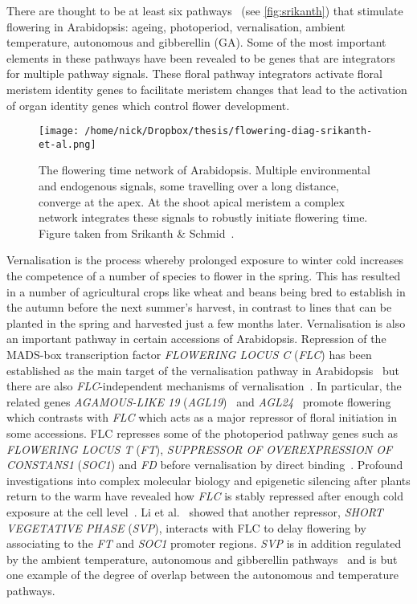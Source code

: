 There are thought to be at least six pathways~\cite{simpson2002,srikanth2011} (see \autoref{fig:srikanth}) that stimulate flowering in Arabidopsis: ageing, photoperiod, vernalisation, ambient temperature, autonomous and gibberellin (GA).
Some of the most important elements in these pathways have been revealed to be genes that are integrators for multiple pathway signals.
These floral pathway integrators activate floral meristem identity genes to facilitate meristem changes that lead to the activation of organ identity genes which control flower development.

\begin{figure*}[hptb!]
  \texttt{[image: /home/nick/Dropbox/thesis/flowering-diag-srikanth-et-al.png]}
  \caption{The flowering time network of Arabidopsis.
    Multiple environmental and endogenous signals, some travelling over a long distance, converge at the apex.
    At the shoot apical meristem a complex network integrates these signals to robustly initiate flowering time.
    Figure taken from Srikanth \& Schmid~\cite{srikanth2011}.
  }
  \label{fig:srikanth}
\end{figure*}
Vernalisation is the process whereby prolonged exposure to winter cold increases the competence of a number of species to flower in the spring.
This has resulted in a number of agricultural crops like wheat and beans being bred to establish in the autumn before the next summer's harvest, in contrast to lines that can be planted in the spring and harvested just a few months later.
Vernalisation is also an important pathway in certain accessions of Arabidopsis.
Repression of the MADS-box transcription factor \emph{FLOWERING LOCUS C} (\emph{FLC}) has been established as the main target of the vernalisation pathway in Arabidopsis~\cite{michaels1999} but there are also \emph{FLC}-independent mechanisms of vernalisation~\cite{michaels2001}.
In particular, the related genes \emph{AGAMOUS-LIKE 19} (\emph{AGL19})~\cite{schonrock2006} and \emph{AGL24}~\cite{michaels2003} promote flowering which contrasts with \emph{FLC} which acts as a major repressor of floral initiation in some accessions.
FLC represses some of the photoperiod pathway genes such as \emph{FLOWERING LOCUS T }(\emph{FT}), \emph{SUPPRESSOR OF OVEREXPRESSION OF CONSTANS1} (\emph{SOC1}) and \emph{FD} before vernalisation by direct binding~\cite{searle2006}.
Profound investigations into complex molecular biology and epigenetic silencing after plants return to the warm have revealed how \emph{FLC} is stably repressed after enough cold exposure at the cell level~\cite{angel2011}.
Li et al.~\cite{li2008} showed that another repressor, \emph{SHORT VEGETATIVE PHASE} (\emph{SVP}), interacts with FLC to delay flowering by associating to the \emph{FT} and \emph{SOC1} promoter regions.
\emph{SVP} is in addition regulated by the ambient temperature, autonomous and gibberellin pathways~\cite{lee2007,li2008} and is but one example of the degree of overlap between the autonomous and temperature pathways.

